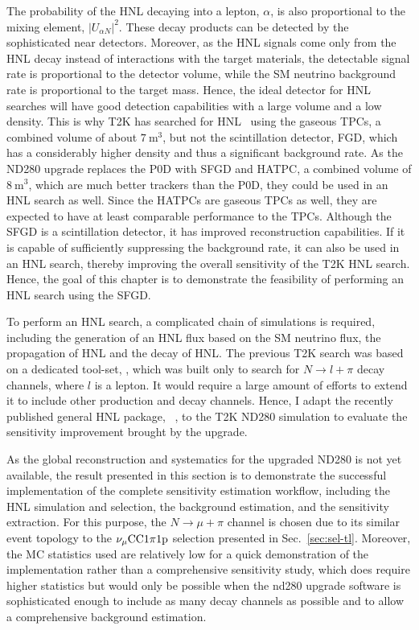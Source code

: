         The probability of the HNL decaying into a lepton, $\alpha$, is also proportional to the mixing element, $|U_{\alpha N}|^2$.
        These decay products can be detected by the sophisticated near detectors.
        Moreover, as the HNL signals come only from the HNL decay instead of interactions with the target materials, the detectable signal rate is proportional to the detector volume, while the SM neutrino background rate is proportional to the target mass.
        Hence, the ideal detector for HNL searches will have good detection capabilities with a large volume and a low density. 
        This is why T2K has searched for HNL~\cite{T2K:2019jwa} using the gaseous TPCs, a combined volume of about $7~\textrm{m}^3$, but not the scintillation detector, FGD, which has a considerably higher density and thus a significant background rate.
        As the ND280 upgrade replaces the P0D with SFGD and HATPC, a combined volume of $8~\textrm{m}^3$, which are much better trackers than the P0D, they could be used in an HNL search as well.
        Since the HATPCs are gaseous TPCs as well, they are expected to have at least comparable performance to the TPCs. 
        Although the SFGD is a scintillation detector, it has improved reconstruction capabilities. 
        If it is capable of sufficiently suppressing the background rate, it can also be used in an HNL search, thereby improving the overall sensitivity of the T2K HNL search.
        Hence, the goal of this chapter is to demonstrate the feasibility of performing an HNL search using the SFGD.

        To perform an HNL search, a complicated chain of simulations is required, including the generation of an HNL flux based on the SM neutrino flux, the propagation of HNL and the decay of HNL. 
        The previous T2K search was based on a dedicated tool-set, , which was built only to search for $N\rightarrow l + \pi$ decay channels, where $l$ is a lepton. 
        It would require a large amount of efforts to extend it to include other production and decay channels. 
        Hence, I adapt the recently published general HNL package, ~\cite{Plows:2022gxc}, to the T2K ND280 simulation to evaluate the sensitivity improvement brought by the upgrade.

        As the global reconstruction and systematics for the upgraded ND280 is not yet available, the result presented in this section is to demonstrate the successful implementation of the complete sensitivity estimation workflow, including the HNL simulation and selection, the background estimation, and the sensitivity extraction. 
        For this purpose, the $N\rightarrow\mu+\pi$ channel is chosen due to its similar event topology to the $\nu_{\mu}\textrm{CC}1\pi1\textrm{p}$ selection presented in Sec.~\ref{sec:sel-tl}.
        Moreover, the MC statistics used are relatively low for a quick demonstration of the implementation rather than a comprehensive sensitivity study, which does require higher statistics but would only be possible when the nd280 upgrade software is sophisticated enough to include as many decay channels as possible and to allow a comprehensive background estimation.

